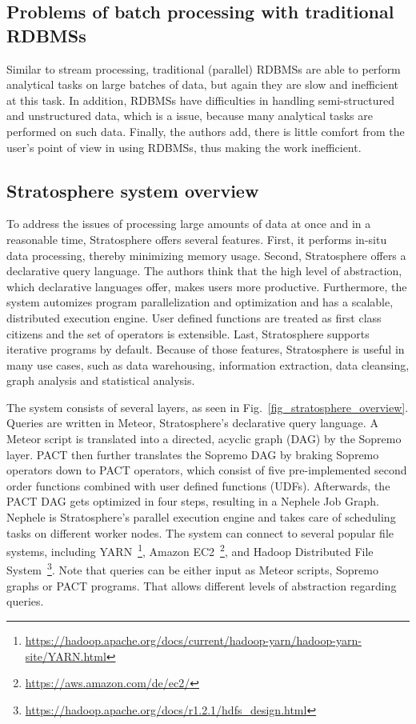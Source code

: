 \subsection{Problems of batch processing with traditional RDBMSs}\label{batchRDBMSProblems}
Similar to stream processing, traditional (parallel) RDBMSs are able to perform analytical tasks on large batches of data, but again they are slow and inefficient at this task. In addition, RDBMSs have difficulties in handling semi-structured and unstructured data, which is a issue, because many analytical tasks are performed on such data. Finally, the authors add, there is little comfort from the user's point of view in using RDBMSs, thus making the work inefficient.

\subsection{Stratosphere system overview}\label{stratosphereOverview}
To address the issues of processing large amounts of data at once and in a reasonable time, Stratosphere offers several features. First, it performs in-situ data processing, thereby minimizing memory usage. Second, Stratosphere offers a declarative query language. The authors think that the high level of abstraction, which declarative languages offer, makes users more productive. Furthermore, the system automizes program parallelization and optimization and has a scalable, distributed execution engine. User defined functions are treated as first class citizens and the set of operators is extensible. Last, Stratosphere supports iterative programs by default. Because of those features, Stratosphere is useful in many use cases, such as data warehousing, information extraction, data cleansing, graph analysis and statistical analysis.

The system consists of several layers, as seen in Fig.~\ref{fig_stratosphere_overview}. Queries are written in Meteor, Stratosphere's declarative query language. A Meteor script is translated into a directed, acyclic graph (DAG) by the Sopremo layer. PACT then further translates the Sopremo DAG by braking Sopremo operators down to PACT operators, which consist of five pre-implemented second order functions combined with user defined functions (UDFs). Afterwards, the PACT DAG gets optimized in four steps, resulting in a Nephele Job Graph. Nephele is Stratosphere's parallel execution engine and takes care of scheduling tasks on different worker nodes. The system can connect to several popular file systems, including YARN~\footnote{\url{https://hadoop.apache.org/docs/current/hadoop-yarn/hadoop-yarn-site/YARN.html}}, Amazon EC2~\footnote{\url{https://aws.amazon.com/de/ec2/}}, and Hadoop Distributed File System~\footnote{\url{https://hadoop.apache.org/docs/r1.2.1/hdfs_design.html}}. Note that queries can be either input as Meteor scripts, Sopremo graphs or PACT programs. That allows different levels of abstraction regarding queries.

